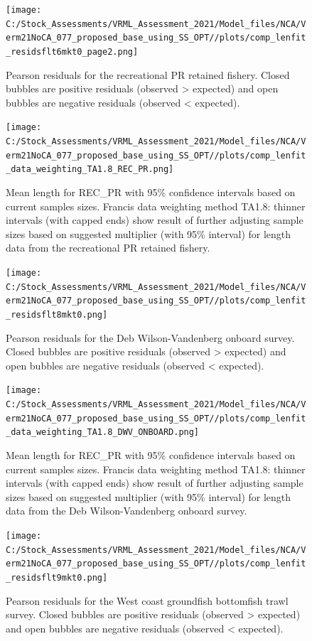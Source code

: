 \documentclass[
  english,
  a4paper,
]{article}
\begin{document}
\begin{figure}
\centering
\texttt{[image: C:/Stock\_Assessments/VRML\_Assessment\_2021/Model\_files/NCA/Verm21NoCA\_077\_proposed\_base\_using\_SS\_OPT//plots/comp\_lenfit\_residsflt6mkt0\_page2.png]}
\caption{Pearson residuals for the recreational PR retained fishery. Closed bubbles are positive residuals (observed \textgreater{} expected) and open bubbles are negative residuals (observed \textless{} expected).\label{fig:len-pearson-REC-PR}}
\end{figure}

\begin{figure}
\centering
\texttt{[image: C:/Stock\_Assessments/VRML\_Assessment\_2021/Model\_files/NCA/Verm21NoCA\_077\_proposed\_base\_using\_SS\_OPT//plots/comp\_lenfit\_data\_weighting\_TA1.8\_REC\_PR.png]}
\caption{Mean length for REC\_PR with 95\% confidence intervals based on current samples sizes. Francis data weighting method TA1.8: thinner intervals (with capped ends) show result of further adjusting sample sizes based on suggested multiplier (with 95\% interval) for length data from the recreational PR retained fishery.\label{fig:mean-len-fit-REC-PR}}
\end{figure}

\begin{figure}
\centering
\texttt{[image: C:/Stock\_Assessments/VRML\_Assessment\_2021/Model\_files/NCA/Verm21NoCA\_077\_proposed\_base\_using\_SS\_OPT//plots/comp\_lenfit\_residsflt8mkt0.png]}
\caption{Pearson residuals for the Deb Wilson-Vandenberg onboard survey. Closed bubbles are positive residuals (observed \textgreater{} expected) and open bubbles are negative residuals (observed \textless{} expected).\label{fig:len-pearson-DWV-ONBOARD}}
\end{figure}

\begin{figure}
\centering
\texttt{[image: C:/Stock\_Assessments/VRML\_Assessment\_2021/Model\_files/NCA/Verm21NoCA\_077\_proposed\_base\_using\_SS\_OPT//plots/comp\_lenfit\_data\_weighting\_TA1.8\_DWV\_ONBOARD.png]}
\caption{Mean length for REC\_PR with 95\% confidence intervals based on current samples sizes. Francis data weighting method TA1.8: thinner intervals (with capped ends) show result of further adjusting sample sizes based on suggested multiplier (with 95\% interval) for length data from the Deb Wilson-Vandenberg onboard survey.\label{fig:mean-len-fit-DWV-ONBOARD}}
\end{figure}

\begin{figure}
\centering
\texttt{[image: C:/Stock\_Assessments/VRML\_Assessment\_2021/Model\_files/NCA/Verm21NoCA\_077\_proposed\_base\_using\_SS\_OPT//plots/comp\_lenfit\_residsflt9mkt0.png]}
\caption{Pearson residuals for the West coast groundfish bottomfish trawl survey. Closed bubbles are positive residuals (observed \textgreater{} expected) and open bubbles are negative residuals (observed \textless{} expected).\label{fig:len-pearson-NWFSC-TWL}}
\end{figure}
\end{document}
